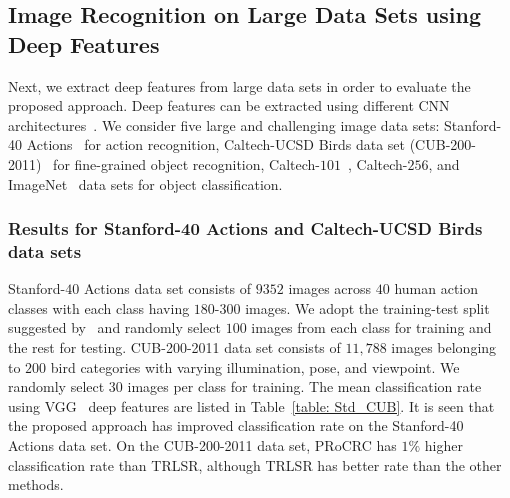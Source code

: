 \subsection{Image Recognition on Large Data Sets using Deep Features}
%
Next, we extract deep features from large data sets in order to evaluate the proposed approach. Deep features can be extracted using different CNN architectures~\cite{VGG,Tatiana}. We consider five large and challenging image data sets: Stanford-40 Actions~\cite{Std_40} for action recognition, Caltech-UCSD Birds data set (CUB-200-2011)~\cite{CUB_2011} for fine-grained object recognition, Caltech-$101$~\cite{Caltech101}, Caltech-$256$, and ImageNet~\cite{Imagenet} data sets for object classification.
%
\subsubsection{Results for Stanford-40 Actions and Caltech-UCSD Birds data sets}
%
Stanford-$40$ Actions data set consists of $9352$ images across $40$ human action classes with each class having $180$-$300$ images. We adopt the training-test split suggested by~\cite{Std_40} and randomly select $100$ images from each class for training and the rest for testing. CUB-200-2011 data set consists of $11,788$ images belonging to $200$ bird categories with varying illumination, pose, and viewpoint. We randomly select $30$ images per class for training. The mean classification rate using VGG~\cite{VGG} deep features are listed in Table~\ref{table: Std_CUB}. It is seen that the proposed approach has improved classification rate on the Stanford-40 Actions data set. On the CUB-200-2011 data set, PRoCRC has $1 \%$ higher classification rate than TRLSR, although TRLSR has better rate than the other methods.
